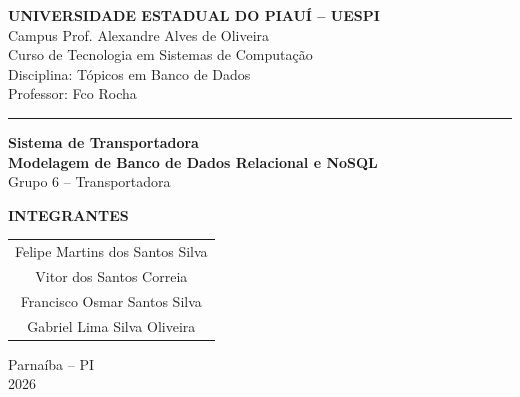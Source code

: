 \begin{titlepage}
\thispagestyle{empty}
\begin{center}
\vspace*{0.3cm}

{\Large\bfseries UNIVERSIDADE ESTADUAL DO PIAUÍ -- UESPI}\\[0.15cm]
{\large Campus Prof. Alexandre Alves de Oliveira}\\[0.15cm]
{\large Curso de Tecnologia em Sistemas de Computação}\\[0.15cm]
{\large Disciplina: Tópicos em Banco de Dados}\\[0.15cm]
{\large Professor: Fco Rocha}

\vspace{1.0cm}
\rule{0.92\linewidth}{0.8pt}
\vspace{0.5cm}

\vspace{1.2cm}
{\Huge\bfseries\color{azul} Sistema de Transportadora}\\[0.45cm]
{\Large\bfseries Modelagem de Banco de Dados Relacional e NoSQL}\\[0.25cm]
{\large Grupo 6 -- Transportadora}

\vspace{1.0cm}
{\large\bfseries INTEGRANTES}\\[0.35cm]
\begin{tabular}{c}
Felipe Martins dos Santos Silva\\
Vitor dos Santos Correia\\
Francisco Osmar Santos Silva\\
Gabriel Lima Silva Oliveira
\end{tabular}

\vfill
{\large Parnaíba -- PI}\\[0.15cm]
{\large 2026}
\end{center}
\end{titlepage}
